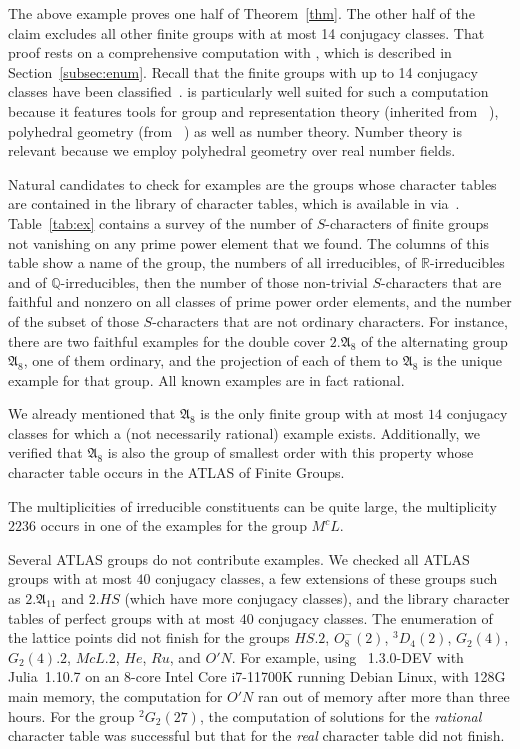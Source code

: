 \documentclass[12pt,leqno,a4paper]{amsart}
\newcommand{\QQ}{{\mathbb{Q}}}
\newcommand{\RR}{{\mathbb{R}}}
\newcommand{\fA}{{\mathfrak{A}}} %
\newcommand{\GAP}{{\sf{GAP}}\xspace}
\newcommand{\polymake}{{\sf{polymake}}\xspace}
\newcommand{\OSCAR}{{\sf{OSCAR}}\xspace}
\theoremstyle{definition}
\begin{document}
The above example proves one half of Theorem~\ref{thm}. The other half of the
claim excludes all other finite groups with at most 14 conjugacy classes.
That proof rests on a comprehensive computation with \OSCAR, which is described
in Section~\ref{subsec:enum}. Recall that the finite groups with up to 14
conjugacy classes have been classified~\cite{VLVL85,VLVL86,VS07}.
\OSCAR is particularly well suited for such
a computation because it features tools for group and representation theory
(inherited from \GAP~\cite{GAP}), polyhedral geometry (from
\polymake~\cite{polymake-lattice}) as well as number theory. Number theory is
relevant because we employ polyhedral geometry over real number fields.

Natural candidates to check for examples are the groups whose character tables
are contained in the library of character tables, which is available in {\OSCAR}
via~\cite{GAP}.
Table~\ref{tab:ex} contains a survey of the number of $S$-characters of finite
groups not vanishing on any prime power element that we found. The columns of
this table show a name of the group, the numbers of all irreducibles, of
$\RR$-irreducibles and of $\QQ$-irreducibles, then the number of those
non-trivial $S$-characters that are faithful and nonzero on all classes of prime
power order elements, and the number of the subset of those $S$-characters that
are not ordinary characters.
For instance, there are two faithful examples for the double cover
$2.\fA_8$ of the alternating group $\fA_8$, one of them ordinary,
and the projection of each of them to $\fA_8$ is the unique example
for that group.
All known examples are in fact rational.

We already mentioned that
$\fA_8$ is the only finite group with at most $14$ conjugacy classes
for which a (not necessarily rational) example exists.  Additionally,
we verified that $\fA_8$ is also the group of smallest order with this
property whose character table occurs in the ATLAS of Finite Groups.

The multiplicities of irreducible constituents can be quite large,
the multiplicity $2236$ occurs in one of the examples for the group $M^cL$.

Several ATLAS groups do not contribute examples.
We checked all ATLAS groups with at most $40$ conjugacy classes,
a few extensions of these groups such as $2.\fA_{11}$ and $2.HS$
(which have more conjugacy classes),
and the library character tables of perfect groups with at most $40$
conjugacy classes.
The enumeration of the lattice points did not finish for the groups
$HS.2$, $O_8^-(2)$, ${}^3D_4(2)$, $G_2(4)$, $G_2(4).2$, $McL.2$, $He$,
$Ru$, and $O'N$.
For example, using \OSCAR~1.3.0-DEV with Julia~1.10.7 on an 8-core
Intel Core i7-11700K running Debian Linux, with 128G main memory,
the computation for $O'N$ ran out of memory after more than three hours.
For the group ${}^2G_2(27)$, the computation of solutions for the
\emph{rational} character table was successful but that for the
\emph{real} character table did not finish.
\end{document}
